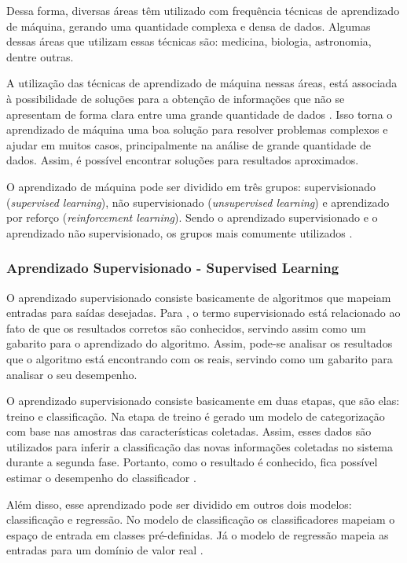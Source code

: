 \documentclass[12pt]{artigoifce}
\begin{document}
Dessa forma, diversas áreas têm utilizado com frequência técnicas de aprendizado de máquina, gerando uma quantidade complexa e densa de dados. Algumas dessas áreas que utilizam essas técnicas são: medicina, biologia, astronomia, dentre outras. 

A utilização das técnicas de aprendizado de máquina nessas áreas, está associada à possibilidade de soluções para a obtenção de informações que não se apresentam de forma clara entre uma grande quantidade de dados \cite{tatsch2019}. Isso torna o aprendizado de máquina uma boa solução para resolver problemas complexos e ajudar em muitos casos, principalmente na análise de grande quantidade de dados. Assim, é possível encontrar soluções para resultados aproximados.

O aprendizado de máquina pode ser dividido em três grupos: supervisionado (\textit{supervised learning}), não supervisionado (\textit{unsupervised learning}) e aprendizado por reforço (\textit{reinforcement learning}). Sendo o aprendizado supervisionado e o aprendizado não supervisionado, os grupos mais comumente utilizados  \cite{tatsch2019}.

\subsubsection{Aprendizado Supervisionado - Supervised Learning}
\label{sec-fundamentacao-aprendizado-supervisionado}

O aprendizado supervisionado consiste basicamente de algoritmos que  mapeiam entradas para saídas desejadas. Para , o termo supervisionado está relacionado ao fato de que os resultados corretos são conhecidos, servindo assim como um gabarito para o aprendizado do algoritmo. Assim, pode-se analisar os resultados que o algoritmo está encontrando com os reais, servindo como um gabarito para analisar o seu desempenho.

O aprendizado supervisionado consiste basicamente em duas etapas, que são elas: treino e classificação. Na etapa de treino é gerado um modelo de categorização com base nas amostras das características coletadas. Assim, esses dados são utilizados para inferir a classificação das novas informações coletadas no sistema durante a segunda fase. Portanto, como o resultado é conhecido, fica possível estimar o desempenho do classificador \cite{tatsch2019}.

Além disso, esse aprendizado pode ser dividido em outros dois modelos: classificação e regressão. No modelo de classificação os classificadores mapeiam o espaço de entrada em classes pré-definidas. Já o modelo de regressão mapeia as entradas para um domínio de valor real \cite{oliveira2017}.
\end{document}
